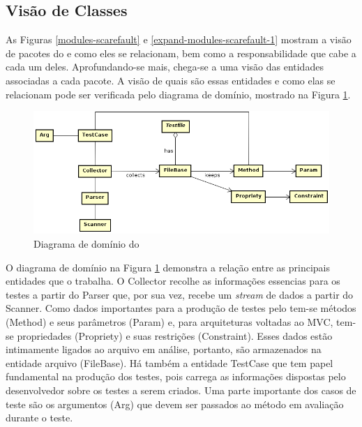 \subsection{Visão de Classes}
As Figuras \ref{modules-scarefault} e \ref{expand-modules-scarefault-1} mostram
a visão de pacotes do \scarefault e como eles se relacionam, bem como a
responsabilidade que cabe a cada um deles. Aprofundando-se mais, chega-se a uma
visão das entidades associadas a cada pacote. A visão de quais são essas
entidades e como elas se relacionam pode ser verificada pelo diagrama de 
domínio, mostrado na Figura \ref{domain-diagram}.
\begin{figure}[h]
  \centering
    \includegraphics[width=\textwidth]{figuras/domain-diagram.png}
    \caption{Diagrama de domínio do \Scarefault}
    \label{domain-diagram}
\end{figure}
\FloatBarrier

O diagrama de domínio na Figura \ref{domain-diagram} demonstra a relação
entre as principais entidades que o \framework trabalha. O \textsf{Collector}
recolhe as  informações essencias para os testes a partir do
\textsf{Parser} que, por sua vez, recebe um \textit{stream} de dados a partir
do \textsf{Scanner}. Como dados importantes para a produção de testes pelo
\scarefault tem-se métodos (\textsf{Method}) e seus parâmetros (\textsf{Param})
e, para arquiteturas voltadas ao MVC, tem-se propriedades (\textsf{Propriety})
e suas restrições (\textsf{Constraint}). Esses dados estão intimamente ligados
ao arquivo em análise, portanto, são armazenados na entidade arquivo (\textsf{FileBase}).
Há também a entidade \textsf{TestCase} que tem papel fundamental na produção
dos testes, pois carrega as informações dispostas pelo desenvolvedor sobre os
testes a serem criados. Uma parte importante dos casos de teste são os
argumentos (\textsf{Arg}) que devem ser passados ao método em avaliação durante o
teste.

